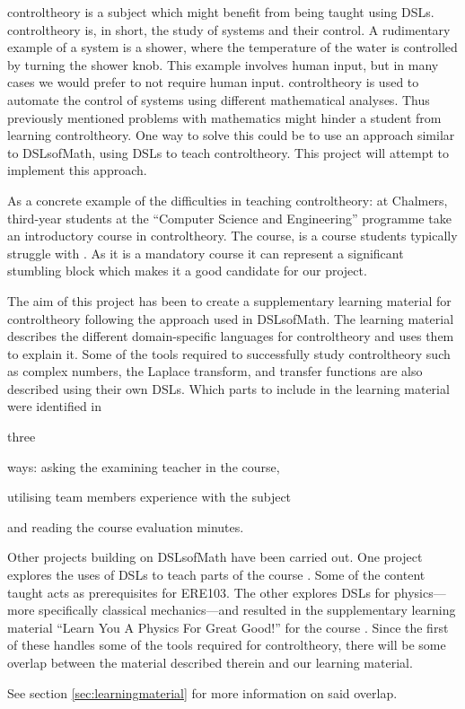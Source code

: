 \Gls{controltheory} is a subject which might benefit from being taught using \gls{DSL}s. \Gls{controltheory} is, in short, the study of systems and their control. 
A rudimentary example of a system is a shower, where the temperature of the water is controlled by turning the shower knob. This example involves human input, but in many cases we would prefer to not require human input. \Gls{controltheory} is used to automate the control of systems using different mathematical analyses. Thus previously mentioned problems with mathematics might hinder a student from learning \gls{controltheory}. One way to solve this could be to use an approach similar to \gls{DSLsofMath}, using DSLs to teach \gls{controltheory}. This project will attempt to implement this approach.

As a concrete example of the difficulties in teaching \gls{controltheory}: at Chalmers, third-year students at the ``Computer Science and Engineering'' programme take an introductory course in \gls{controltheory}. The course,  is a course students typically struggle with \cite{Jansson_2019}. As it is a mandatory course it can represent a significant stumbling block which makes it a good candidate for our project. 

The aim of this project has been to create a supplementary learning material for \gls{controltheory} following the approach used in \gls{DSLsofMath}. The learning material describes the different domain-specific languages for \gls{controltheory} and uses them to explain it. Some of the tools required to successfully study \gls{controltheory} such as complex numbers, the Laplace transform, and transfer functions are also described using their own \gls{DSL}s. Which parts to include in the learning material were identified in %
\begin{modtext}
three %
\end{modtext}ways: asking the examining teacher in the course, %
\begin{newtext}
utilising team members experience with the subject %
\end{newtext} 
and reading the course evaluation minutes. 

Other projects building on \gls{DSLsofMath} have been carried out. One project \cite{tssarbete} explores the uses of \gls{DSL}s to teach parts of the course . Some of the content taught acts as prerequisites for \gls{ERE103}. The other \cite{fysikarbete} explores \gls{DSL}s for physics---more specifically classical mechanics---and resulted in the supplementary learning material ``Learn You A Physics For Great Good!'' \cite{PhysicsGit} for the course . Since the first of these handles some of the tools required for \gls{controltheory}, there will be some overlap between the material described therein and our learning material. 
\begin{newtext}
See section \ref{sec:learningmaterial} for more information on said overlap.
\end{newtext}


